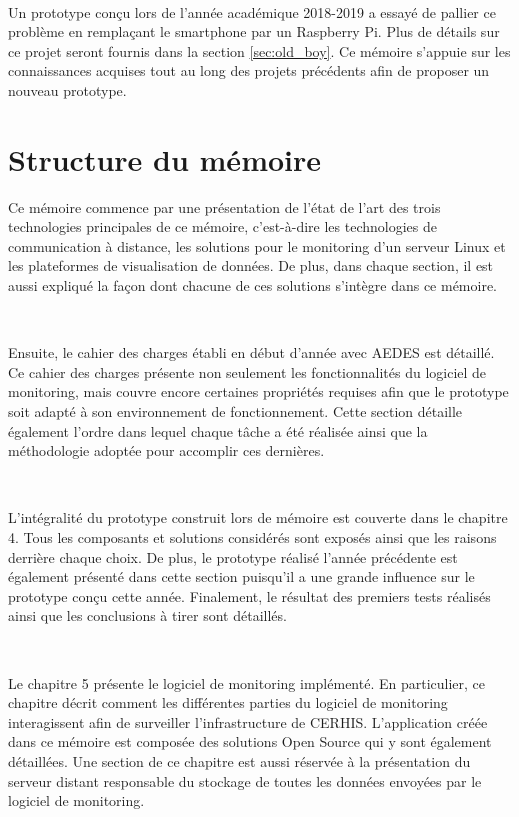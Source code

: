~

\noindent
Un prototype conçu lors de l'année académique 2018-2019 a essayé de pallier ce problème en remplaçant le smartphone par un Raspberry Pi. Plus de détails sur ce projet seront fournis dans la section \ref{sec:old_boy}. Ce mémoire s'appuie sur les connaissances acquises tout au long des projets précédents afin de proposer un nouveau prototype.


\section{Structure du mémoire}

\noindent
Ce mémoire commence par une présentation de l’état de l’art des trois technologies principales de ce mémoire, c’est-à-dire les technologies de communication à distance, les solutions pour le monitoring d’un serveur Linux et les plateformes de visualisation de données. De plus, dans chaque section, il est aussi expliqué la façon dont chacune de ces solutions s'intègre dans ce mémoire.

~

\noindent
Ensuite, le cahier des charges établi en début d’année avec AEDES est détaillé. Ce cahier des charges présente non seulement les fonctionnalités du logiciel de monitoring, mais couvre encore certaines propriétés requises afin que le prototype soit adapté à son environnement de fonctionnement. Cette section détaille également l’ordre dans lequel chaque tâche a été réalisée ainsi que la méthodologie adoptée pour accomplir ces dernières.

~

\noindent
L’intégralité du prototype construit lors de mémoire est couverte dans le chapitre 4. Tous les composants et solutions considérés sont exposés ainsi que les raisons derrière chaque choix.  De plus, le prototype réalisé l’année précédente est également présenté dans cette section puisqu’il a une grande influence sur le prototype conçu cette année. Finalement, le résultat des premiers tests réalisés ainsi que les conclusions à tirer sont détaillés.

~

\noindent
Le chapitre 5 présente le logiciel de monitoring implémenté. En particulier, ce chapitre décrit comment les différentes parties du logiciel de monitoring interagissent afin de surveiller l’infrastructure de CERHIS. L’application créée dans ce mémoire est composée des solutions Open Source qui y sont également détaillées. Une section de ce chapitre est aussi réservée à la présentation du serveur distant responsable du stockage de toutes les données envoyées par le logiciel de monitoring.

